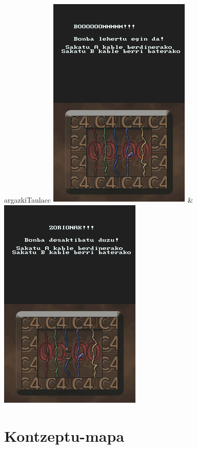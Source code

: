 \documentclass[dvipsnames]{../../../../AritzhClass}
\begin{document}
\begin{taula}{}{argazkiTaula}{cc}
\includegraphics[scale=0.75]{Jokoa3} & \includegraphics[scale=0.75]{Jokoa4}
\end{taula}
\section{Kontzeptu-mapa}
\end{document}
